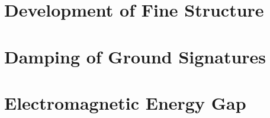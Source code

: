 





\section{Development of Fine Structure}

\section{Damping of Ground Signatures}

\section{Electromagnetic Energy Gap}


